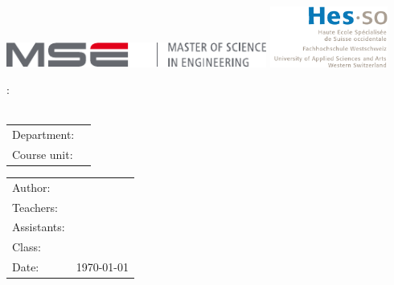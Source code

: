 
\begin{center}
\hfill \includegraphics[height=0.8cm]{Include/Figure/logo/mse-full-cropped.pdf}
\hfill \includegraphics[height=2cm]{Include/Figure/logo/logo_hesso.pdf}
\end{center}

\vfill

\begin{center}
	\Large \nameLabo:\\
	\huge \titre \\
\end{center}

\begin{center}
	\begin{tabular}{l l}
		Department:  & \departement\\
		Course unit: & \cours\\
	\end{tabular}
\end{center}
\vfill

\vfill
\begin{tabular}{l l}
	\Large	Author:   	  & \Large \nomAuteur\\
	Teachers:		 		& \professeur\\
	Assistants:          &\assistant\\
	Class:               & \classe\\
	Date:                 & \today\\
\end{tabular}
\vfill
